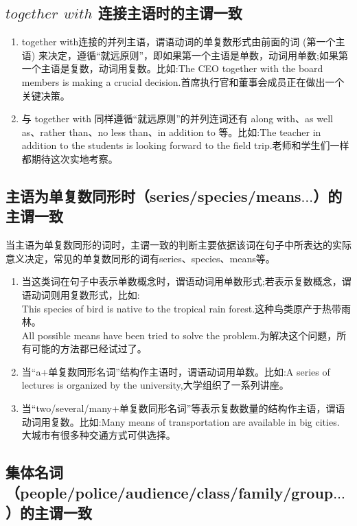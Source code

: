 \subsection{\(together\) \(with\) 连接主语时的主谓一致}

\begin{enumerate}
  \item together with连接的并列主语，谓语动词的单复数形式由前面的词 (第一个主语) 来决定，遵循“就远原则”，即如果第一个主语是单数，动词用单数;如果第一个主语是复数，动词用复数。比如:The CEO together with the board members is making a crucial decision.首席执行官和董事会成员正在做出一个关键决策。
  \item 与 together with 同样遵循“就远原则”的并列连词还有 along with、as well as、rather than、no less than、in addition to 等。比如:The teacher in addition to the students is looking forward to the field trip.老师和学生们一样都期待这次实地考察。
\end{enumerate}

\subsection{主语为单复数同形时（series/species/means\(\ldots\)）的主谓一致}

当主语为单复数同形的词时，主谓一致的判断主要依据该词在句子中所表达的实际意义决定，常见的单复数同形的词有series、species、means等。
\begin{enumerate}
  \item 当这类词在句子中表示单数概念时，谓语动词用单数形式;若表示复数概念，谓语动词则用复数形式，比如:\\
        This species of bird is native to the tropical rain forest.这种鸟类原产于热带雨林。\\
        All possible means have been tried to solve the problem.为解决这个问题，所有可能的方法都已经试过了。
  \item 当“a+单复数同形名词”结构作主语时，谓语动词用单数。比如:A series of lectures is organized by the university,大学组织了一系列讲座。
  \item 当“two/several/many+单复数同形名词”等表示复数数量的结构作主语，谓语动词用复数。比如:Many means of transportation are available in big cities. 大城市有很多种交通方式可供选择。
\end{enumerate}

\subsection{集体名词（people/police/audience/class/family/group\(\ldots\)）的主谓一致}

